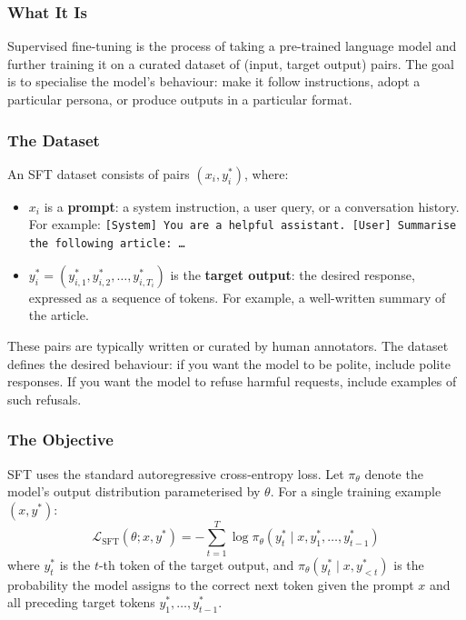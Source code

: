 \documentclass[11pt, a4paper]{article}
\begin{document}
\subsubsection{What It Is}

Supervised fine-tuning is the process of taking a pre-trained language model and further training it on a curated dataset of (input, target output) pairs. The goal is to specialise the model's behaviour: make it follow instructions, adopt a particular persona, or produce outputs in a particular format.

\subsubsection{The Dataset}

An SFT dataset consists of pairs $(x_i, y^*_i)$, where:
\begin{itemize}
  \item $x_i$ is a \textbf{prompt}: a system instruction, a user query, or a conversation history. For example: \texttt{[System] You are a helpful assistant. [User] Summarise the following article:~\ldots}
  \item $y^*_i = (y^*_{i,1}, y^*_{i,2}, \ldots, y^*_{i,T_i})$ is the \textbf{target output}: the desired response, expressed as a sequence of tokens. For example, a well-written summary of the article.
\end{itemize}

These pairs are typically written or curated by human annotators. The dataset defines the desired behaviour: if you want the model to be polite, include polite responses. If you want the model to refuse harmful requests, include examples of such refusals.

\subsubsection{The Objective}

SFT uses the standard autoregressive cross-entropy loss. Let $\pi_\theta$ denote the model's output distribution parameterised by $\theta$. For a single training example $(x, y^*)$:
\[
  \mathcal{L}_{\text{SFT}}(\theta; x, y^*) = -\sum_{t=1}^{T} \log \pi_\theta(y^*_t \mid x, y^*_1, \ldots, y^*_{t-1})
\]
where $y^*_t$ is the $t$-th token of the target output, and $\pi_\theta(y^*_t \mid x, y^*_{<t})$ is the probability the model assigns to the correct next token given the prompt $x$ and all preceding target tokens $y^*_1, \ldots, y^*_{t-1}$.
\end{document}
